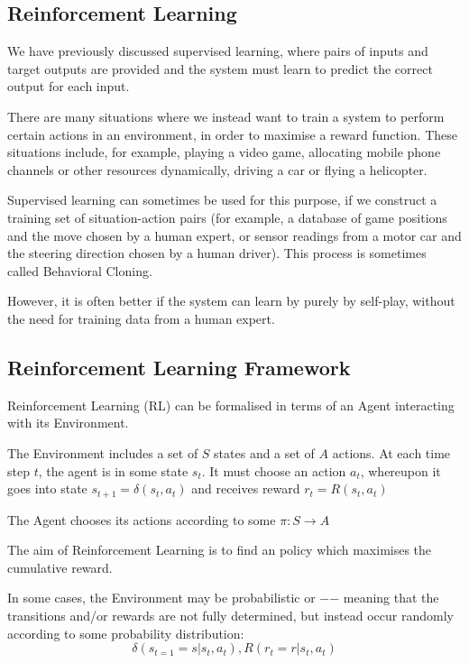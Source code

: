 \documentclass[11pt]{article}
\begin{document}
\subsection{Reinforcement Learning}\label{subsec:reinforcement-learning}
We have previously discussed supervised learning, where pairs of inputs and
target outputs are provided and the system must learn to predict the correct
output for each input.

There are many situations where we instead want to train a system to perform
certain actions in an environment, in order to maximise a reward function.
These situations include, for example, playing a video game, allocating mobile
phone channels or other resources dynamically, driving a car or flying a
helicopter.

Supervised learning can sometimes be used for this purpose, if we construct a
training set of situation-action pairs (for example, a database of game
positions and the move chosen by a human expert, or sensor readings from a
motor car and the steering direction chosen by a human driver).
This process is sometimes called Behavioral Cloning.

However, it is often better if the system can learn by purely by self-play,
without the need for training data from a human expert.

\subsection{Reinforcement Learning Framework}\label{subsec:reinforcement-learning-framework}
Reinforcement Learning (RL) can be formalised in terms of an Agent interacting
with its Environment.

The Environment includes a set of $S$ states and a set of $A$ actions.
At each time step $t$, the agent is in some state $s_t$.
It must choose an action $a_t$, whereupon it goes into state
$s_{t + 1} = \delta (s_t , a_t)$ and receives reward $r_t = R(s_t, a_t)$

The Agent chooses its actions according to some
 $\pi : S \rightarrow A $

The aim of Reinforcement Learning is to find an  policy which
maximises the cumulative reward.

In some cases, the Environment may be probabilistic or  −−
meaning that the transitions and/or rewards are not fully determined, but
instead occur randomly according to some probability distribution:
\[\delta (s_{t = 1} = s | s_t, a_t),R (r_t = r | s_t, a_t)\]
\end{document}
